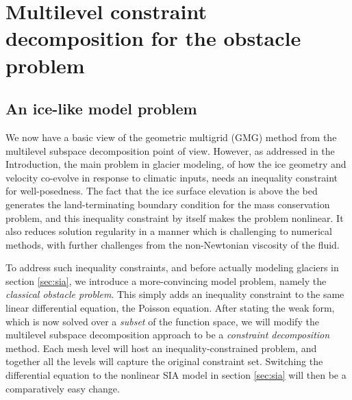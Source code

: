 \documentclass[letterpaper,final,12pt,reqno]{amsart}
\numberwithin{equation}{section}
\numberwithin{figure}{section}
\numberwithin{table}{section}
\begin{document}
\section{Multilevel constraint decomposition for the obstacle problem} \label{sec:obstacle}

\subsection*{An ice-like model problem}  We now have a basic view of the geometric multigrid (GMG) method from the multilevel subspace decomposition point of view.  However, as addressed in the Introduction, the main problem in glacier modeling, of how the ice geometry and velocity co-evolve in response to climatic inputs, needs an inequality constraint for well-posedness.  The fact that the ice surface elevation is above the bed generates the land-terminating boundary condition for the mass conservation problem, and this inequality constraint by itself makes the problem nonlinear.  It also reduces solution regularity in a manner which is challenging to numerical methods, with further challenges from the non-Newtonian viscosity of the fluid.

To address such inequality constraints, and before actually modeling glaciers in section \ref{sec:sia}, we introduce a more-convincing model problem, namely the \emph{classical obstacle problem}.  This simply adds an inequality constraint to the same linear differential equation, the Poisson equation.  After stating the weak form, which is now solved over a \emph{subset} of the function space, we will modify the multilevel subspace decomposition approach to be a \emph{constraint decomposition} method.  Each mesh level will host an inequality-constrained problem, and together all the levels will capture the original constraint set.  Switching the differential equation to the nonlinear SIA model in section \ref{sec:sia} will then be a comparatively easy change.
\end{document}
